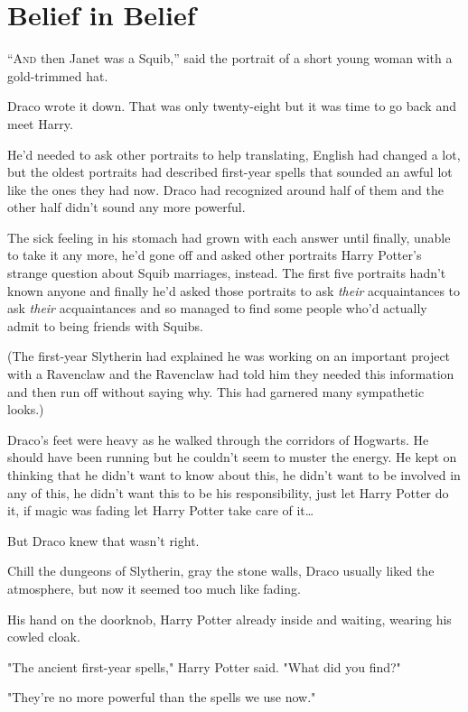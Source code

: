 \chapter{Belief in Belief}

\lettrine{“A}{nd} then Janet was a Squib,'' said the portrait of a short young woman with a
gold-trimmed hat.

Draco wrote it down. That was only twenty-eight but it was time to go back and
meet Harry.

He'd needed to ask other portraits to help translating, English had changed a
lot, but the oldest portraits had described first-year spells that sounded an
awful lot like the ones they had now. Draco had recognized around half of them
and the other half didn't sound any more powerful.

The sick feeling in his stomach had grown with each answer until finally,
unable to take it any more, he'd gone off and asked other portraits Harry
Potter's strange question about Squib marriages, instead. The first five
portraits hadn't known anyone and finally he'd asked those portraits to ask
\emph{their} acquaintances to ask \emph{their} acquaintances and so managed to
find some people who'd actually admit to being friends with Squibs.

(The first-year Slytherin had explained he was working on an important project
with a Ravenclaw and the Ravenclaw had told him they needed this information
and then run off without saying why. This had garnered many sympathetic looks.)

Draco's feet were heavy as he walked through the corridors of Hogwarts. He
should have been running but he couldn't seem to muster the energy. He kept on
thinking that he didn't want to know about this, he didn't want to be involved
in any of this, he didn't want this to be his responsibility, just let Harry
Potter do it, if magic was fading let Harry Potter take care of it{\ldots}

But Draco knew that wasn't right.

Chill the dungeons of Slytherin, gray the stone walls, Draco usually liked the
atmosphere, but now it seemed too much like fading.

His hand on the doorknob, Harry Potter already inside and waiting, wearing his
cowled cloak.

"The ancient first-year spells," Harry Potter said. "What did you find?"

"They're no more powerful than the spells we use now."

